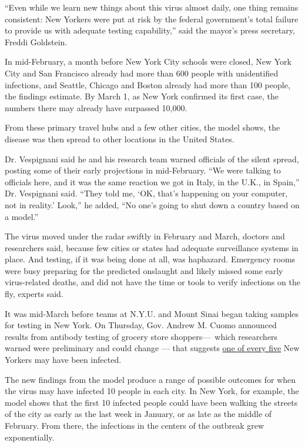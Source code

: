 ``Even while we learn new things about this virus almost daily, one
thing remains consistent: New Yorkers were put at risk by the federal
government's total failure to provide us with adequate testing
capability,'' said the mayor's press secretary, Freddi Goldstein.

In mid-February, a month before New York City schools were closed, New
York City and San Francisco already had more than 600 people with
unidentified infections, and Seattle, Chicago and Boston already had
more than 100 people, the findings estimate. By March 1, as New York
confirmed its first case, the numbers there may already have surpassed
10,000.

From these primary travel hubs and a few other cities, the model shows,
the disease was then spread to other locations in the United States.

Dr. Vespignani said he and his research team warned officials of the
silent spread, posting some of their early projections in mid-February.
``We were talking to officials here, and it was the same reaction we got
in Italy, in the U.K., in Spain,'' Dr. Vespignani said. ``They told me,
`OK, that's happening on your computer, not in reality.' Look,'' he
added, ``No one's going to shut down a country based on a model.''

The virus moved under the radar swiftly in February and March, doctors
and researchers said, because few cities or states had adequate
surveillance systems in place. And testing, if it was being done at all,
was haphazard. Emergency rooms were busy preparing for the predicted
onslaught and likely missed some early virus-related deaths, and did not
have the time or tools to verify infections on the fly, experts said.

It was mid-March before teams at N.Y.U. and Mount Sinai began taking
samples for testing in New York. On Thursday, Gov. Andrew M. Cuomo
announced results from antibody testing of grocery store
shoppers---~which researchers warned were preliminary and could change
--- that suggests
\href{https://www.nytimes.com/2020/04/23/nyregion/coronavirus-antibodies-test-ny.html}{one
of every five} New Yorkers may have been infected.

The new findings from the model produce a range of possible outcomes for
when the virus may have infected 10 people in each city. In New York,
for example, the model shows that the first 10 infected people could
have been walking the streets of the city as early as the last week in
January, or as late as the middle of February. From there, the
infections in the centers of the outbreak grew exponentially.

